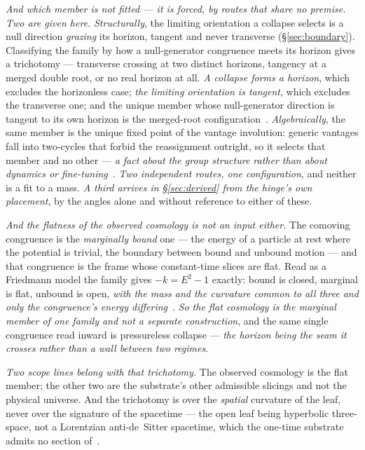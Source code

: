\documentclass[11pt,a4paper]{article}
\theoremstyle{plain}
\theoremstyle{definition}
\begin{document}
\emph{And which member is not fitted --- it is forced, by routes that share no premise. Two are given here.}
\emph{Structurally}, the limiting orientation a collapse selects is a null direction \emph{grazing} its
horizon, tangent and never transverse (\S\ref{sec:boundary}). Classifying the family by how a null-generator
congruence meets its horizon gives a trichotomy --- transverse crossing at two distinct horizons, tangency at
a merged double root, or no real horizon at all. \emph{A collapse forms a horizon}, which excludes the
horizonless case; \emph{the limiting orientation is tangent}, which excludes the transverse one; and the
unique member whose null-generator direction is tangent to its own horizon is the merged-root
configuration~\cite{JanzenCRframework}. \emph{Algebraically}, the same member is the unique fixed point of
the vantage involution: generic vantages fall into two-cycles that forbid the reassignment outright, so it
selects that member and no other --- \emph{a fact about the group structure rather than about dynamics or
fine-tuning}~\cite{JanzenGroupoid}. \emph{Two independent routes, one configuration}, and neither is a fit to
a mass. \emph{A third arrives in \S\ref{sec:derived} from the hinge's own placement}, by the angles alone and
without reference to either of these.

\emph{And the flatness of the observed cosmology is not an input either.} The comoving congruence is the
\emph{marginally bound} one --- the energy of a particle at rest where the potential is trivial, the boundary
between bound and unbound motion --- and that congruence is the frame whose constant-time slices are flat.
Read as a Friedmann model the family gives $-k=E^{2}-1$ exactly: bound is closed, marginal is flat, unbound
is open, \emph{with the mass and the curvature common to all three and only the congruence's energy
differing}~\cite{JanzenOperator}. \emph{So the flat cosmology is the marginal member of one family and not a
separate construction}, and the same single congruence read inward is pressureless collapse --- \emph{the
horizon being the seam it crosses rather than a wall between two regimes}.

\emph{Two scope lines belong with that trichotomy.} The observed cosmology is the flat member; the other two
are the substrate's other admissible slicings and not the physical universe. And the trichotomy is over the
\emph{spatial} curvature of the leaf, never over the signature of the spacetime --- the open leaf being
hyperbolic three-space, not a Lorentzian anti-de~Sitter spacetime, which the one-time substrate admits no
section of~\cite{JanzenOperator}.
\end{document}
